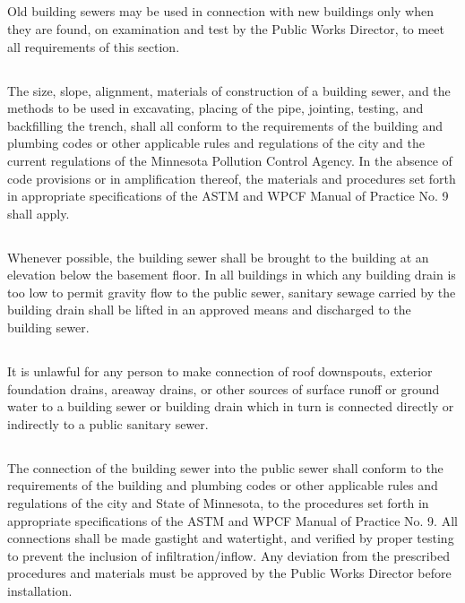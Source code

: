 \subsection{}
Old building sewers may be used in connection with new buildings only when they are found, on examination and test by the Public Works Director, to meet all requirements of this section.
\subsection{}
The size, slope, alignment, materials of construction of a building sewer, and the methods to be used in excavating, placing of the pipe, jointing, testing, and backfilling the trench, shall all conform to the requirements of the building and plumbing codes or other applicable rules and regulations of the city and the current regulations of the Minnesota Pollution Control Agency.  In the absence of code provisions or in amplification thereof, the materials and procedures set forth in appropriate specifications of the ASTM and WPCF Manual of Practice No. 9 shall apply.
\subsection{}
Whenever possible, the building sewer shall be brought to the building at an elevation below the basement floor.  In all buildings in which any building drain is too low to permit gravity flow to the public sewer, sanitary sewage carried by the building drain shall be lifted in an approved means and discharged to the building sewer.
\subsection{}
It is unlawful for any person to make connection of roof downspouts, exterior foundation drains, areaway drains, or other sources of surface runoff or ground water to a building sewer or building drain which in turn is connected directly or indirectly to a public sanitary sewer.
\subsection{}
The connection of the building sewer into the public sewer shall conform to the requirements of the building and plumbing codes or other applicable rules and regulations of the city and State of Minnesota, to the procedures set forth in appropriate specifications of the ASTM and WPCF Manual of Practice No. 9.  All connections shall be made gastight and watertight, and verified by proper testing to prevent the inclusion of infiltration/inflow.  Any deviation from the prescribed procedures and materials must be approved by the Public Works Director before installation.
